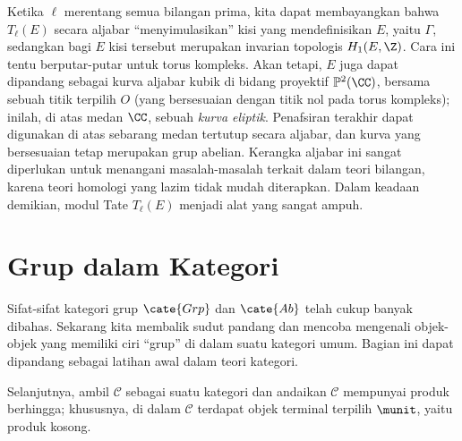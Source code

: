 \begin{example}
Ketika $\ell$ merentang semua bilangan prima, kita dapat membayangkan bahwa $T_\ell(E)$ secara aljabar ``menyimulasikan'' kisi yang mendefinisikan $E$, yaitu $\Gamma$, sedangkan bagi $E$ kisi tersebut merupakan invarian topologis $H_1(E, \Z)$. Cara ini tentu berputar-putar untuk torus kompleks. Akan tetapi, $E$ juga dapat dipandang sebagai kurva aljabar kubik di bidang proyektif $\mathbb{P}^2(\CC)$, bersama sebuah titik terpilih $O$ (yang bersesuaian dengan titik nol pada torus kompleks); inilah, di atas medan $\CC$, sebuah \emph{kurva eliptik}. Penafsiran terakhir dapat digunakan di atas sebarang medan tertutup secara aljabar, dan kurva yang bersesuaian tetap merupakan grup abelian. Kerangka aljabar ini sangat diperlukan untuk menangani masalah-masalah terkait dalam teori bilangan, karena teori homologi yang lazim tidak mudah diterapkan. Dalam keadaan demikian, modul Tate $T_\ell(E)$ menjadi alat yang sangat ampuh.
\end{example}

\section{Grup dalam Kategori}\label{sec:group-in-cat}
Sifat-sifat kategori grup $\cate{Grp}$ dan $\cate{Ab}$ telah cukup banyak dibahas. Sekarang kita membalik sudut pandang dan mencoba mengenali objek-objek yang memiliki ciri ``grup'' di dalam suatu kategori umum. Bagian ini dapat dipandang sebagai latihan awal dalam teori kategori.

Selanjutnya, ambil $\mathcal{C}$ sebagai suatu kategori dan andaikan $\mathcal{C}$ mempunyai produk berhingga; khususnya, di dalam $\mathcal{C}$ terdapat objek terminal terpilih $\munit$, yaitu produk kosong.

